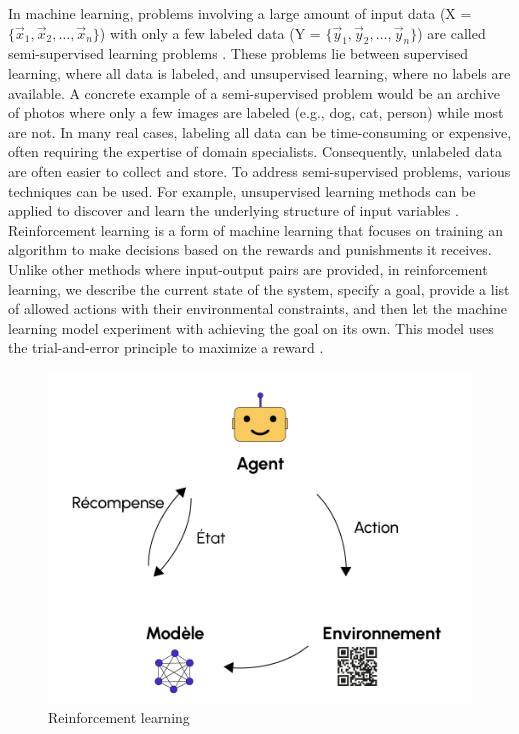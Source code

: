 In machine learning, problems involving a large amount of input data (X = \(\{\vec{x}_1, \vec{x}_2, \ldots, \vec{x}_n\}\)) with only a few labeled data (Y = \(\{\vec{y}_1, \vec{y}_2, \ldots, \vec{y}_n\}\)) are called semi-supervised learning problems \cite{ismaili2019}. These problems lie between supervised learning, where all data is labeled, and unsupervised learning, where no labels are available.
A concrete example of a semi-supervised problem would be an archive of photos where only a few images are labeled (e.g., dog, cat, person) while most are not. In many real cases, labeling all data can be time-consuming or expensive, often requiring the expertise of domain specialists. Consequently, unlabeled data are often easier to collect and store.
To address semi-supervised problems, various techniques can be used. For example, unsupervised learning methods can be applied to discover and learn the underlying structure of input variables \cite{song2014semi}.
Reinforcement learning is a form of machine learning that focuses on training an algorithm to make decisions based on the rewards and punishments it receives. Unlike other methods where input-output pairs are provided, in reinforcement learning, we describe the current state of the system, specify a goal, provide a list of allowed actions with their environmental constraints, and then let the machine learning model experiment with achieving the goal on its own. This model uses the trial-and-error principle to maximize a reward \cite{zschech2021machine}.

\begin{figure}[ht!]
	\centering
	\includegraphics[scale=0.6]{Chap1/images/renforcement3}
	\caption{Reinforcement learning \cite{ismaili2019}}
	\label{fig:renforcement3}
\end{figure}


